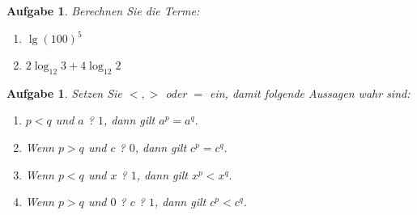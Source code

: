 \documentclass[12pt]{article}
\newtheorem{exercise}[satz]{Aufgabe}
\begin{document}
\vspace{0.1cm}

\begin{exercise}
  Berechnen Sie die Terme:
    \begin{multicols}{2}
    \begin{enumerate}
      \item[(a)] $\lg{(100)^5}$
      \item[(b)] $2\log_{12}{3}+4\log_{12}{2}$
    \end{enumerate}
  \end{multicols}
\end{exercise}

\vspace{0.1cm}

\begin{exercise}
  Setzen Sie $<,>$ oder $=$ ein, damit folgende Aussagen wahr sind:
  \begin{enumerate}
    \item[(a)]  $p<q$ \textrm{und} $a$ ? $1$, \textrm{dann gilt} $a^p = a^q.$
    \item[(b)] \textrm{Wenn} $p>q$ \textrm{und} $c$ ? $0$, \textrm{dann gilt} $c^p = c^q.$
    \item[(c)] \textrm{Wenn} $p<q$ \textrm{und} $x$ ? $1$, \textrm{dann gilt} $x^p < x^q.$
    \item[(c)] \textrm{Wenn} $p>q$ \textrm{und} $0$ ? $c$ ? $1$, \textrm{dann gilt} $c^p < c^q.$
  \end{enumerate}
\end{exercise}
\end{document}
